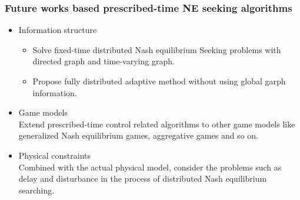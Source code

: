 \begin{frame}
\frametitle{\normalsize{Future works based prescribed-time NE seeking algorithms}}\transwipe
\begin{itemize}
    \item \textcolor[rgb]{1,0,0}{Information structure}
        \begin{itemize}
            \item  Solve fixed-time distributed Nash equilibrium Seeking problems with directed graph and time-varying graph. 
            \item  Propose fully distributed adaptive method without using global garph information. 
        \end{itemize} 
    \vspace{6pt}
    \vspace{6pt}
    \item \textcolor[rgb]{1,0,0}{Game models} \\
    Extend prescribed-time control related algorithms to other game models like generalized Nash equilibrium games, aggregative games and so on.
    \vspace{6pt}
    
    \item \textcolor[rgb]{1,0,0}{Physical constraints} \\
    Combined with the actual physical model, consider the problems such as delay and disturbance in the process of distributed Nash equilibrium searching.
\end{itemize}
\end{frame}


